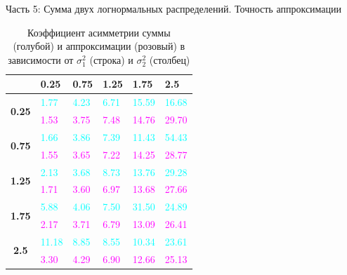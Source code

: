\documentclass[ucs, notheorems, handout]{beamer}
\begin{document}
	\begin{frame}{Часть 5: Сумма двух логнормальных распределений. Точность аппроксимации}
		
		\begin{table}[]
			\caption{Коэффициент асимметрии суммы (голубой) и аппроксимации (розовый) в зависимости от $\sigma_{1}^{2}$ (строка) и $\sigma_{2}^{2}$ (столбец) }
			\begin{tabular}{|c|l|l|l|l|l|}
				\hline
				& \textbf{0.25} & \textbf{0.75} & \textbf{1.25} & \textbf{1.75} & \textbf{2.5} \\ \hline
				\multirow{2}{*}{\textbf{0.25}} & \textcolor{cyan}{1.77}          & \textcolor{cyan}{4.23}          & \textcolor{cyan}{6.71}          & \textcolor{cyan}{15.59}         & \textcolor{cyan}{16.68}        \\ \cline{2-6} 
				& \textcolor{magenta}{1.53}          & \textcolor{magenta}{3.75}          & \textcolor{magenta}{7.48}          & \textcolor{magenta}{14.76}         & \textcolor{magenta}{29.70}        \\ \hline
				\multirow{2}{*}{\textbf{0.75}} & \textcolor{cyan}{1.66}          & \textcolor{cyan}{3.86}          & \textcolor{cyan}{7.39}          & \textcolor{cyan}{11.43}         & \textcolor{cyan}{54.43}        \\ \cline{2-6} 
				& \textcolor{magenta}{1.55}          & \textcolor{magenta}{3.65}          & \textcolor{magenta}{7.22}          & \textcolor{magenta}{14.25}         & \textcolor{magenta}{28.77}        \\ \hline
				\multirow{2}{*}{\textbf{1.25}} & \textcolor{cyan}{2.13}          & \textcolor{cyan}{3.68}          & \textcolor{cyan}{8.73}          & \textcolor{cyan}{13.76}         & \textcolor{cyan}{29.28}        \\ \cline{2-6} 
				& \textcolor{magenta}{1.71}          & \textcolor{magenta}{3.60}          & \textcolor{magenta}{6.97}          & \textcolor{magenta}{13.68}         & \textcolor{magenta}{27.66}        \\ \hline
				\multirow{2}{*}{\textbf{1.75}} & \textcolor{cyan}{5.88}          & \textcolor{cyan}{4.06}          & \textcolor{cyan}{7.50}          & \textcolor{cyan}{31.50}         & \textcolor{cyan}{24.89}        \\ \cline{2-6} 
				& \textcolor{magenta}{2.17}          & \textcolor{magenta}{3.71}          & \textcolor{magenta}{6.79}          & \textcolor{magenta}{13.09}         & \textcolor{magenta}{26.41}        \\ \hline
				\multirow{2}{*}{\textbf{2.5}}  & \textcolor{cyan}{11.18}         & \textcolor{cyan}{8.85}          & \textcolor{cyan}{8.55}          & \textcolor{cyan}{10.34}         & \textcolor{cyan}{23.61}        \\ \cline{2-6} 
				& \textcolor{magenta}{3.30}          & \textcolor{magenta}{4.29}          & \textcolor{magenta}{6.90}          & \textcolor{magenta}{12.66}         & \textcolor{magenta}{25.13}        \\ \hline
			\end{tabular}
		\end{table}
	

\end{frame}
\end{document}
